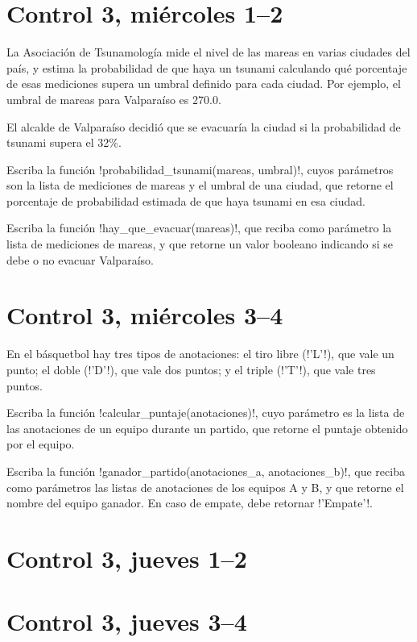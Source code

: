 \documentclass[12pt,spanish,a5paper,landscape]{article}
\begin{document}
  \pagestyle{empty}
  \thispagestyle{empty}

  \part*{Control 3, miércoles 1--2}
  \newpage
  La Asociación de Tsunamología mide el nivel de las mareas
  en varias ciudades del país,
  y estima la probabilidad de que haya un tsunami
  calculando qué porcentaje de esas mediciones
  supera un umbral definido para cada ciudad.
  Por ejemplo,
  el umbral de mareas para Valparaíso es 270.0.

  El alcalde de Valparaíso decidió que se evacuaría la ciudad
  si la probabilidad de tsunami supera el 32\%.

  Escriba la función \li!probabilidad_tsunami(mareas, umbral)!,
  cuyos parámetros son la lista de mediciones de mareas
  y el umbral de una ciudad,
  que retorne el porcentaje de probabilidad estimada
  de que haya tsunami en esa ciudad.

  Escriba la función \li!hay_que_evacuar(mareas)!,
  que reciba como parámetro la lista de mediciones de mareas,
  y que retorne un valor booleano
  indicando si se debe o no evacuar Valparaíso.
  

  \newpage
  \part*{Control 3, miércoles 3--4}
  \newpage
  En el básquetbol hay tres tipos de anotaciones:
  el tiro libre (\li!'L'!), que vale un punto;
  el doble (\li!'D'!), que vale dos puntos; y
  el triple (\li!'T'!), que vale tres puntos.

  Escriba la función \li!calcular_puntaje(anotaciones)!,
  cuyo parámetro es la lista de las anotaciones
  de un equipo durante un partido,
  que retorne el puntaje obtenido por el equipo.

  Escriba la función \li!ganador_partido(anotaciones_a, anotaciones_b)!,
  que reciba como parámetros las listas de anotaciones
  de los equipos A y B,
  y que retorne el nombre del equipo ganador.
  En caso de empate,
  debe retornar \li!'Empate'!.

  

  \newpage
  \part*{Control 3, jueves 1--2}
  \newpage

  \newpage
  \part*{Control 3, jueves 3--4}
  \newpage
\end{document}
